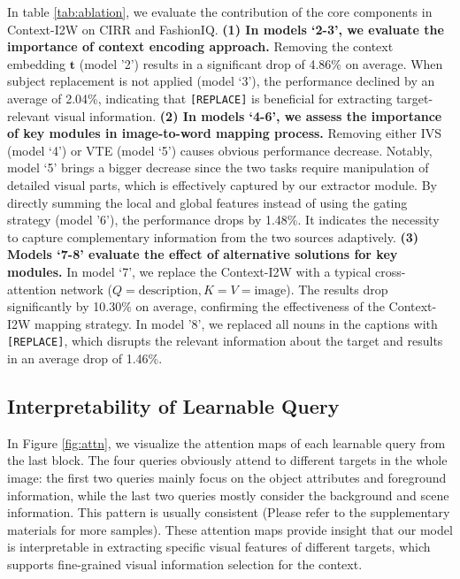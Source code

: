 \documentclass[letterpaper]{article} \usepackage{aaai24}  \usepackage{times}  \usepackage{helvet}  \usepackage{courier}  \usepackage[hyphens]{url}  \usepackage{graphicx} \urlstyle{rm} \def\UrlFont{\rm}  \usepackage{natbib}  \usepackage{caption} \frenchspacing  \setlength{\pdfpagewidth}{8.5in} \setlength{\pdfpageheight}{11in} \usepackage{algorithm}
\begin{document}
In table \ref{tab:ablation}, we evaluate the contribution of the core components in Context-I2W on CIRR and FashionIQ. \textbf{(1) In models `2-3', we evaluate the importance of context encoding approach.} Removing the context embedding  $\boldsymbol{t}$ (model '2') results in a significant drop of 4.86\% on average. 
When subject replacement is not applied (model `3'), the performance declined by an average of 2.04\%, indicating that \texttt{[REPLACE]} is beneficial for extracting target-relevant visual information. 
\textbf{(2) In models `4-6', we assess the importance of key modules in image-to-word mapping process.} Removing either IVS (model `4') or VTE (model `5') causes obvious performance decrease. Notably, model `5' brings a bigger decrease since the two tasks require manipulation of detailed visual parts, which is effectively captured by our extractor module. 
By directly summing the local and global features instead of using the gating strategy (model '6'), the performance drops by 1.48\%. It indicates the necessity to capture complementary information from the two sources adaptively. \textbf{(3) Models `7-8' evaluate the effect of alternative solutions for key modules.} In model `7', we  replace the Context-I2W with a typical cross-attention network ($Q=\text{description}, K=V=\text{image}$). The results drop significantly by 10.30\% on average, confirming the effectiveness of the Context-I2W mapping strategy. In model '8', we replaced all nouns in the captions with \texttt{[REPLACE]}, which disrupts the relevant information about the target and results in an average drop of 1.46\%.

\subsection{Interpretability of Learnable Query}

In Figure \ref{fig:attn}, we visualize the attention maps of each learnable query from the last block. The four queries obviously attend to different targets in the whole image: the first two queries mainly focus on the object attributes and foreground information, while the last two queries mostly consider the background and scene information. This pattern is usually consistent (Please refer to the supplementary materials for more samples). These attention maps provide insight that our model is interpretable in extracting specific visual features of different targets, which supports fine-grained visual information selection for the context.
\end{document}
